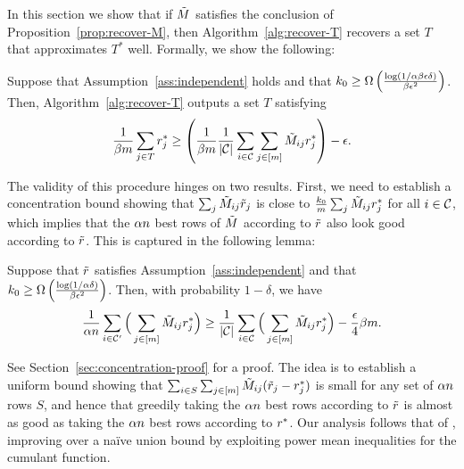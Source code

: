 In this section we show that if $\tilde{M}$ satisfies the conclusion of 
Proposition~\ref{prop:recover-M}, then Algorithm~\ref{alg:recover-T} 
recovers a set $T$ that approximates $T^*$ well. Formally, we show 
the following:
\begin{proposition}
\label{prop:recover-T}
Suppose that Assumption~\ref{ass:independent} holds and that 
$k_0 \geq \Omega\left( \frac{\log(1/\alpha\beta\epsilon\delta)}{\beta\epsilon^2} \right)$. 
Then, Algorithm~\ref{alg:recover-T} outputs a set $T$ satisfying 
\begin{equation}
\label{eq:recover-T}
\frac{1}{\beta m}\sum_{j \in T} r^*_j \geq \left( \frac{1}{\beta m}\frac{1}{|\mathcal{C}|}\sum_{i \in \mathcal{C}} \sum_{j \in [m]} \tilde{M}_{ij}r^*_j \right) - \epsilon.
\end{equation}
\end{proposition}
The validity of this procedure hinges on two results. First, we need to establish 
a concentration bound showing that $\sum_j \tilde{M}_{ij}\tilde{r}_j$ is close to 
$\frac{k_0}{m}\sum_j \tilde{M}_{ij}r^*_j$ for all $i \in \mathcal{C}$, which implies that 
the $\alpha n$ best rows of $\tilde{M}$ according to $\tilde{r}$ also look good 
according to $\tilde{r}$. This is captured in the following lemma:
\begin{lemma}
\label{lem:robs-rtrue}
Suppose that $\tilde{r}$ satisfies Assumption~\ref{ass:independent} and that 
$k_0 \geq \Omega\left( \frac{\log(1/\alpha\delta)}{\beta\epsilon^2} \right)$. 
Then, with probability $1-\delta$, we have
\begin{equation}
\label{eq:robs-rtrue}
\frac{1}{\alpha n} \sum_{i \in \mathcal{C}'} \Big(\sum_{j \in [m]} \tilde{M}_{ij}r^*_j\Big) \geq \frac{1}{|\mathcal{C}|} \sum_{i \in \mathcal{C}} \Big(\sum_{j \in [m]} \tilde{M}_{ij}r^*_j\Big) - \frac{\epsilon}{4}\beta m.
\end{equation}
\end{lemma}
See Section~\ref{sec:concentration-proof} for a proof.
The idea is to establish a uniform bound showing that 
$\sum_{i \in S} \sum_{j \in [m]} \tilde{M}_{ij}(\tilde{r}_j - r^*_j)$ is small for any 
set of $\alpha n$ rows $S$, and hence that greedily taking the $\alpha n$ 
best rows according to $\tilde{r}$ is almost as good as taking the $\alpha n$ 
best rows according to $r^*$. Our analysis follows that of 
\citet{todo}, improving over a na\"{i}ve union bound by exploiting power mean 
inequalities for the cumulant function. 

